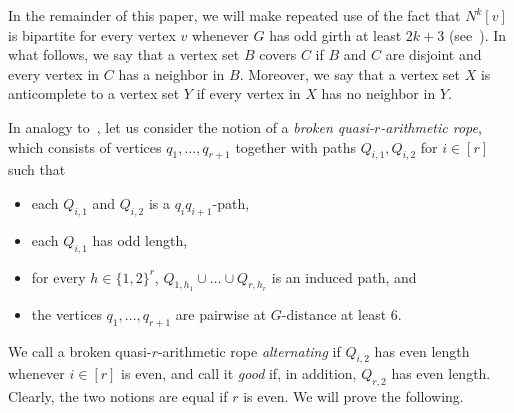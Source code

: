 \documentclass{article}
\begin{document}
In the remainder of this paper, we will make repeated use of the fact that $N^{k}[v]$ is bipartite for every vertex $v$ whenever $G$ has odd girth at least $2k + 3$ (see~\cite[Obs. 2.3]{chudnovsky2024colouringtperfectgraphs}).
In what follows, we say that a vertex set $B$ covers $C$ if $ B$ and $ C$ are disjoint and every vertex in $C$ has a neighbor in $B$. Moreover, we say that a vertex set $X$ is anticomplete to a vertex set $Y$ if every vertex in $X$ has no neighbor in $Y$.

In analogy to~\cite{chudnovsky2024colouringtperfectgraphs}, let us consider the notion of a \emph{broken quasi-$r$-arithmetic rope}, which consists of vertices $q_1, \dots, q_{r + 1}$ together with paths $Q_{i, 1}, Q_{i, 2}$ for $i \in [r]$ such that 

\begin{itemize}
    \item each $Q_{i, 1}$ and $Q_{i, 2}$ is a $q_iq_{i+1}$-path,
    \item each $Q_{i, 1}$ has odd length,
    \item for every $h \in \{1, 2\}^r$, $Q_{1, h_1} \cup \dots \cup Q_{r, h_r}$ is an induced path, and
    \item the vertices $q_1, \dots, q_{r + 1}$ are pairwise at $G$-distance at least 6.
\end{itemize}

We call a broken quasi-$r$-arithmetic rope \emph{alternating} if $Q_{i, 2}$ has even length whenever $i \in [r]$ is even, and call it \emph{good} if, in addition, $Q_{r,2}$ has even length.
Clearly, the two notions are equal if $r$ is even.
We will prove the following.
\end{document}
